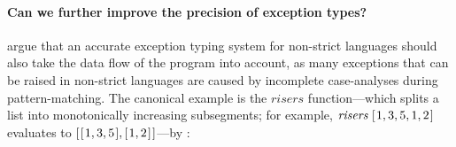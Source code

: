 \documentclass{llncs}
\newcommand{\Varid}[1]{\mathit{#1}}
\begin{document}
\paragraph{Can we further improve the precision of exception types?}
\cite{Koot:2015:TEA:2678015.2682542} argue
that an accurate exception typing system for non-strict languages should also take the data flow of the program into account, as many exceptions that can be raised in non-strict languages are caused by incomplete case-analyses during pattern-matching. The canonical example is the \ensuremath{\Varid{risers}} function---which splits a list into monotonically increasing subsegments; for example, \ensuremath{\Varid{risers}\;[\mskip1.5mu \mathrm{1},\mathrm{3},\mathrm{5},\mathrm{1},\mathrm{2}\mskip1.5mu]} evaluates to \ensuremath{[\mskip1.5mu [\mskip1.5mu \mathrm{1},\mathrm{3},\mathrm{5}\mskip1.5mu],[\mskip1.5mu \mathrm{1},\mathrm{2}\mskip1.5mu]\mskip1.5mu]}---by \cite{Mitchell:2008:PBE:1411286.1411293}:
    
\end{document}
